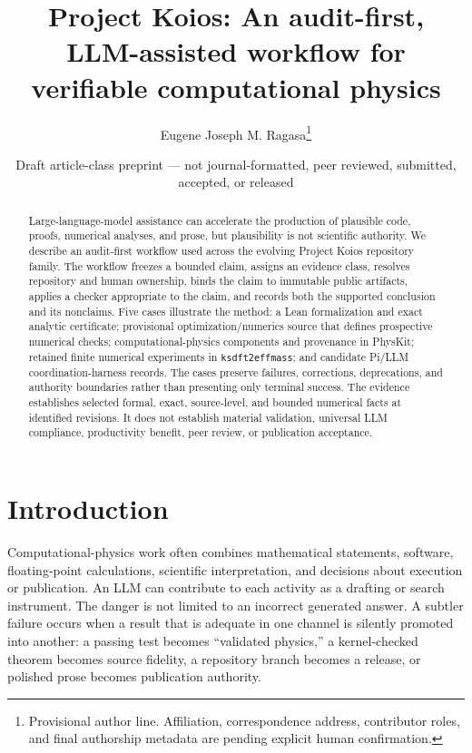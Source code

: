 \documentclass[11pt]{article}
\title{Project Koios: An audit-first, LLM-assisted workflow for verifiable computational physics}
\author{Eugene Joseph M. Ragasa\thanks{Provisional author line. Affiliation,
correspondence address, contributor roles, and final authorship metadata are
pending explicit human confirmation.}}
\date{Draft article-class preprint --- not journal-formatted, peer reviewed,
submitted, accepted, or released}
\newcommand{\projectkoios}{Project Koios}
\begin{document}
\maketitle

\begin{center}
\end{center}

\begin{abstract}
Large-language-model assistance can accelerate the production of plausible
code, proofs, numerical analyses, and prose, but plausibility is not scientific
authority. We describe an audit-first workflow used across the evolving
\projectkoios{} repository family. The workflow freezes a bounded claim,
assigns an evidence class, resolves repository and human ownership, binds the
claim to immutable public artifacts, applies a checker appropriate to the
claim, and records both the supported conclusion and its nonclaims. Five cases
illustrate the method: a Lean formalization and exact analytic certificate;
provisional optimization/numerics source that defines prospective numerical
checks; computational-physics components and provenance in PhysKit; retained
finite numerical experiments in \texttt{ksdft2effmass}; and candidate Pi/LLM
coordination-harness records. The cases preserve failures, corrections,
deprecations, and authority boundaries rather than presenting only terminal
success. The evidence establishes selected formal, exact, source-level, and
bounded numerical facts at identified revisions. It does not establish material
validation, universal LLM compliance, productivity benefit, peer review, or
publication acceptance.
\end{abstract}

\section{Introduction}

Computational-physics work often combines mathematical statements, software,
floating-point calculations, scientific interpretation, and decisions about
execution or publication. An LLM can contribute to each activity as a drafting
or search instrument. The danger is not limited to an incorrect generated
answer. A subtler failure occurs when a result that is adequate in one channel
is silently promoted into another: a passing test becomes ``validated
physics,'' a kernel-checked theorem becomes source fidelity, a repository
branch becomes a release, or polished prose becomes publication authority.
\end{document}
